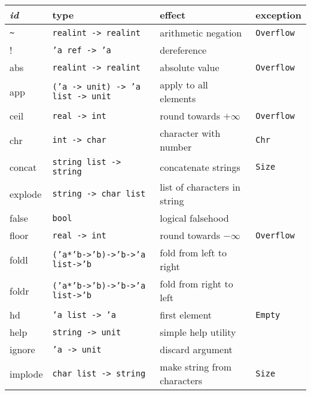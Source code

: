 \documentclass[fleqn,a4paper]{article}
\begin{document}
\begin{tabular}{@{\tt\ \ }llll}\hline
{\it id\/}  &  type &     effect & exception \\\hline

\verb#~#    & {\tt realint -> realint}  &           arithmetic negation
        & {\tt Overflow}\\

!           & {\tt 'a ref -> 'a} &        dereference\\

abs         & {\tt realint -> realint}  & absolute value & {\tt Overflow}\\

app         & {\tt ('a -> unit) -> 'a list -> unit} 
        & apply to all elements\\

ceil       & {\tt real -> int} &           round towards $+\infty$ 
        & {\tt Overflow}\\

chr         & {\tt int -> char} &           character with number &
{\tt Chr}\\

concat      & {\tt string list -> string} & concatenate strings 
& {\tt Size}\\

explode     & {\tt string -> char list} &   list of characters in string\\

false       & {\tt bool} & logical falsehood\\

floor       & {\tt real -> int} &           round towards $-\infty$ 
        & {\tt Overflow}\\

foldl       & {\tt ('a*'b->'b)->'b->'a list->'b}
        & fold from left to right\\

foldr       & {\tt ('a*'b->'b)->'b->'a list->'b}
        & fold from right to left\\

hd          & {\tt 'a list -> 'a}         & first element & {\tt Empty}\\

help        & {\tt string -> unit}        & simple help utility\\

ignore      & {\tt 'a -> unit} &            discard argument\\

implode     & {\tt char list -> string} &   make string from
characters & {\tt Size}\\


\end{tabular}
\end{document}
